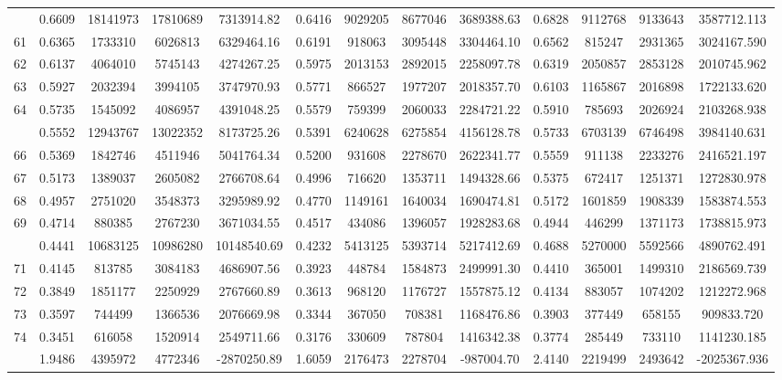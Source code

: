 \documentclass[
  12pt,
]{article}
\begin{document}
\begin{longtable}[t]{lcccccccccccc}
\addlinespace
60 & 0.6609 & 18141973 & 17810689 & 7313914.82 & 0.6416 & 9029205 & 8677046 & 3689388.63 & 0.6828 & 9112768 & 9133643 & 3587712.113\\
61 & 0.6365 & 1733310 & 6026813 & 6329464.16 & 0.6191 & 918063 & 3095448 & 3304464.10 & 0.6562 & 815247 & 2931365 & 3024167.590\\
62 & 0.6137 & 4064010 & 5745143 & 4274267.25 & 0.5975 & 2013153 & 2892015 & 2258097.78 & 0.6319 & 2050857 & 2853128 & 2010745.962\\
63 & 0.5927 & 2032394 & 3994105 & 3747970.93 & 0.5771 & 866527 & 1977207 & 2018357.70 & 0.6103 & 1165867 & 2016898 & 1722133.620\\
64 & 0.5735 & 1545092 & 4086957 & 4391048.25 & 0.5579 & 759399 & 2060033 & 2284721.22 & 0.5910 & 785693 & 2026924 & 2103268.938\\
\addlinespace
65 & 0.5552 & 12943767 & 13022352 & 8173725.26 & 0.5391 & 6240628 & 6275854 & 4156128.78 & 0.5733 & 6703139 & 6746498 & 3984140.631\\
66 & 0.5369 & 1842746 & 4511946 & 5041764.34 & 0.5200 & 931608 & 2278670 & 2622341.77 & 0.5559 & 911138 & 2233276 & 2416521.197\\
67 & 0.5173 & 1389037 & 2605082 & 2766708.64 & 0.4996 & 716620 & 1353711 & 1494328.66 & 0.5375 & 672417 & 1251371 & 1272830.978\\
68 & 0.4957 & 2751020 & 3548373 & 3295989.92 & 0.4770 & 1149161 & 1640034 & 1690474.81 & 0.5172 & 1601859 & 1908339 & 1583874.553\\
69 & 0.4714 & 880385 & 2767230 & 3671034.55 & 0.4517 & 434086 & 1396057 & 1928283.68 & 0.4944 & 446299 & 1371173 & 1738815.973\\
\addlinespace
70 & 0.4441 & 10683125 & 10986280 & 10148540.69 & 0.4232 & 5413125 & 5393714 & 5217412.69 & 0.4688 & 5270000 & 5592566 & 4890762.491\\
71 & 0.4145 & 813785 & 3084183 & 4686907.56 & 0.3923 & 448784 & 1584873 & 2499991.30 & 0.4410 & 365001 & 1499310 & 2186569.739\\
72 & 0.3849 & 1851177 & 2250929 & 2767660.89 & 0.3613 & 968120 & 1176727 & 1557875.12 & 0.4134 & 883057 & 1074202 & 1212272.968\\
73 & 0.3597 & 744499 & 1366536 & 2076669.98 & 0.3344 & 367050 & 708381 & 1168476.86 & 0.3903 & 377449 & 658155 & 909833.720\\
74 & 0.3451 & 616058 & 1520914 & 2549711.66 & 0.3176 & 330609 & 787804 & 1416342.38 & 0.3774 & 285449 & 733110 & 1141230.185\\
\addlinespace
75 & 1.9486 & 4395972 & 4772346 & -2870250.89 & 1.6059 & 2176473 & 2278704 & -987004.70 & 2.4140 & 2219499 & 2493642 & -2025367.936\\*
\end{longtable}
\endgroup{}
\end{document}
